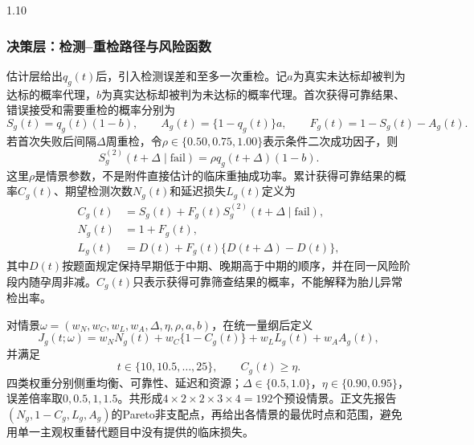 \documentclass[12pt,a4paper]{ctexrep}
\numberwithin{equation}{section}
\begin{document}
\begin{spacing}{1.10}
{			\subsubsection{决策层：检测--重检路径与风险函数}
			估计层给出$q_g(t)$后，引入检测误差和至多一次重检。记$a$为真实未达标却被判为达标的概率代理，$b$为真实达标却被判为未达标的概率代理。首次获得可靠结果、错误接受和需要重检的概率分别为
			\begin{equation}
			S_g(t)=q_g(t)(1-b),\qquad
			A_g(t)=\{1-q_g(t)\}a,\qquad
			F_g(t)=1-S_g(t)-A_g(t).
			\label{eq:q2_first_path}
			\end{equation}
			若首次失败后间隔$\Delta$周重检，令$\rho\in\{0.50,0.75,1.00\}$表示条件二次成功因子，则
			\begin{equation}
			S_g^{(2)}(t+\Delta\mid\mathrm{fail})
			=\rho q_g(t+\Delta)(1-b).
			\label{eq:q2_second_success}
			\end{equation}
			这里$\rho$是情景参数，不是附件直接估计的临床重抽成功率。累计获得可靠结果的概率$C_g(t)$、期望检测次数$N_g(t)$和延迟损失$L_g(t)$定义为
			\begin{equation}
			\begin{aligned}
			C_g(t)&=S_g(t)+F_g(t)S_g^{(2)}(t+\Delta\mid\mathrm{fail}),\\
			N_g(t)&=1+F_g(t),\\
			L_g(t)&=D(t)+F_g(t)\{D(t+\Delta)-D(t)\},
			\end{aligned}
			\label{eq:q2_path_outputs}
			\end{equation}
			其中$D(t)$按题面规定保持早期低于中期、晚期高于中期的顺序，并在同一风险阶段内随孕周非减。$C_g(t)$只表示获得可靠筛查结果的概率，不能解释为胎儿异常检出率。

			对情景$\omega=(w_N,w_C,w_L,w_A,\Delta,\eta,\rho,a,b)$，在统一量纲后定义
			\begin{equation}
			J_g(t;\omega)=w_NN_g(t)+w_C\{1-C_g(t)\}
			+w_LL_g(t)+w_AA_g(t),
			\label{eq:q2_objective}
			\end{equation}
			并满足
			\begin{equation}
			t\in\{10,10.5,\ldots,25\},\qquad C_g(t)\geq\eta.
			\label{eq:q2_constraints}
			\end{equation}
			四类权重分别侧重均衡、可靠性、延迟和资源；$\Delta\in\{0.5,1.0\}$，$\eta\in\{0.90,0.95\}$，误差倍率取$0,0.5,1,1.5$。共形成$4\times2\times2\times3\times4=192$个预设情景。正文先报告$(N_g,1-C_g,L_g,A_g)$的Pareto非支配点，再给出各情景的最优时点和范围，避免用单一主观权重替代题目中没有提供的临床损失。

}
\end{spacing}
\end{document}
